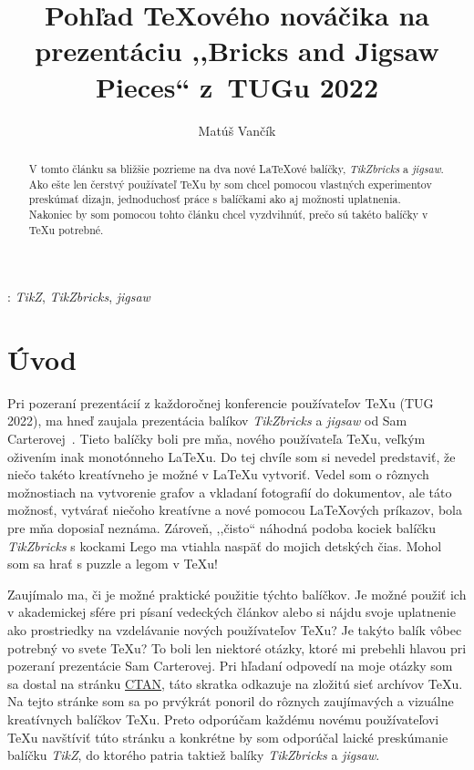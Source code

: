 \documentclass{csbulletin}
\newcommand\TikZ{Ti\textit{k}Z}
\begin{document}

\shorthandoff{-}


\title{Pohľad \TeX ového nováčika na prezentáciu ,,Bricks and Jigsaw Pieces`` z~TUGu 2022}
\author{Matúš Vančík}
\maketitle[1ex]

\begin{abstract}
V tomto článku sa bližšie pozrieme na dva nové \LaTeX ové balíčky, \emph{\TikZ bricks} a \emph{jigsaw}. Ako ešte len čerstvý používateľ \TeX u by som chcel pomocou vlastných experimentov preskúmať dizajn, jednoduchosť práce s balíčkami ako aj možnosti uplatnenia. Nakoniec by som pomocou tohto článku chcel vyzdvihnúť, prečo sú takéto balíčky v \TeX u potrebné.
\end{abstract}
\klucoveslova: \emph{\TikZ}, \emph{\TikZ bricks}, \emph{jigsaw}
\section{Úvod}


Pri pozeraní prezentácií z každoročnej konferencie používateľov \TeX u (TUG 2022), ma hneď zaujala prezentácia balíkov \emph{\TikZ bricks} a \emph{jigsaw} od Sam Carterovej~\cite{video}. Tieto balíčky boli pre mňa, nového používateľa \TeX u, veľkým oživením inak monotónneho \LaTeX u. Do tej chvíle som si nevedel predstaviť, že niečo takéto kreatívneho je možné v \LaTeX u vytvoriť. Vedel som o rôznych možnostiach na vytvorenie grafov a vkladaní fotografií do dokumentov, ale táto možnosť, vytvárať niečoho kreatívne a nové pomocou \LaTeX ových príkazov, bola pre mňa doposiaľ neznáma. Zároveň, ,,čisto`` náhodná podoba kociek balíčku \emph{\TikZ bricks} s kockami Lego ma vtiahla naspäť do mojich detských čias. Mohol som sa hrať s puzzle a legom v \TeX u!

Zaujímalo ma, či je možné praktické použitie týchto balíčkov. Je možné použiť ich v akademickej sfére pri písaní vedeckých článkov alebo si nájdu svoje uplatnenie ako prostriedky na vzdelávanie nových používateľov \TeX u? Je takýto balík vôbec potrebný vo svete \TeX u? To boli len niektoré otázky, ktoré mi prebehli hlavou pri pozeraní prezentácie Sam Carterovej.
Pri hľadaní odpovedí na moje otázky som sa dostal na stránku \href{https://www.ctan.org/}{CTAN}, táto skratka odkazuje na zložitú sieť archívov \TeX u. Na tejto stránke som sa po prvýkrát ponoril do rôznych zaujímavých a vizuálne kreatívnych balíčkov \TeX u. Preto odporúčam každému novému používateľovi \TeX u navštíviť túto stránku a konkrétne by som odporúčal laické preskúmanie balíčku \emph{\TikZ}, do ktorého patria taktiež balíky \emph{\TikZ bricks} a \emph{jigsaw}.\\
\end{document}
